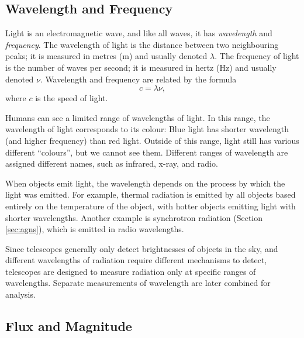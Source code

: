         \subsection{Wavelength and Frequency}
        \label{sec:wavelength}

            Light is an electromagnetic wave, and like all waves, it has
            \emph{wavelength} and \emph{frequency}. The wavelength of light is
            the distance between two neighbouring peaks; it is measured in
            metres (m) and usually denoted $\lambda$. The frequency of light is
            the number of waves per second; it is measured in hertz (Hz) and
            usually denoted $\nu$. Wavelength and frequency are related by the
            formula
            \[
                c = \lambda \nu,
            \]
            where $c$ is the speed of light.

            Humans can see a limited range of wavelengths of light. In this
            range, the wavelength of light corresponds to its colour: Blue light
            has shorter wavelength (and higher frequency) than red light.
            Outside of this range, light still has various different
            ``colours'', but we cannot see them. Different ranges of wavelength
            are assigned different names, such as infrared, x-ray, and radio.

            When objects emit light, the wavelength depends on the process by
            which the light was emitted. For example, thermal radiation is
            emitted by all objects based entirely on the temperature of the
            object, with hotter objects emitting light with shorter wavelengths.
            Another example is synchrotron radiation (Section \ref{sec:agns}),
            which is emitted in radio wavelengths.

            Since telescopes generally only detect brightnesses of objects in
            the sky, and different wavelengths of radiation require different
            mechanisms to detect, telescopes are designed to measure radiation
            only at specific ranges of wavelengths. Separate measurements of
            wavelength are later combined for analysis.

        \subsection{Flux and Magnitude}

